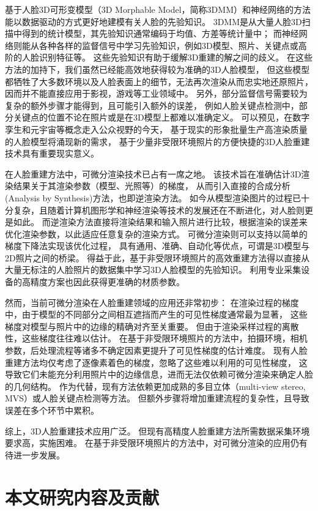 基于人脸3D可形变模型（3D Morphable Model，简称3DMM）和神经网络的方法能以数据驱动的方式更好地建模有关人脸的先验知识。
3DMM是从大量人脸3D扫描中得到的统计模型，其先验知识通常编码于均值、方差等统计量中；
而神经网络则能从各种各样的监督信号中学习先验知识，例如3D模型、照片、关键点或高阶的人脸识别特征等。
这些先验知识有助于缓解3D重建的解之间的歧义。
在这些方法的加持下，我们虽然已经能高效地获得较为准确的3D人脸模型，
但这些模型都牺牲了大多数环境以及人脸表面上的细节，无法再次渲染从而忠实地还原照片，
因而并不能直接应用于影视，游戏等工业领域中。
另外，部分监督信号需要较为复杂的额外步骤才能得到，且可能引入额外的误差，
例如人脸关键点检测中，部分关键点的位置不论在照片或是在3D模型上都难以准确定义。
可以预见，在数字孪生和元宇宙等概念走入公众视野的今天，
基于现实的形象批量生产高渲染质量的人脸模型将涌现新的需求，
基于少量非受限环境照片的方便快捷的3D人脸重建技术具有重要现实意义。

在人脸重建方法中，可微分渲染技术已占有一席之地。
该技术旨在准确估计3D渲染结果关于其渲染参数（模型、光照等）的梯度，
从而引入直接的合成分析(Analysis by Synthesis)方法，也即逆渲染方法。
如今从模型渲染图片的过程已十分复杂，且随着计算机图形学和神经渲染等技术的发展还在不断进化，对人脸则更是如此。
而逆渲染方法直接将渲染结果和输入照片进行比较，根据渲染的误差来优化渲染参数，以此适应任意复杂的渲染方式。
可微分渲染则可以支持以简单的梯度下降法实现该优化过程，
具有通用、准确、自动化等优点，可谓是3D模型与2D照片之间的桥梁。
得益于此，基于非受限环境照片的高效重建方法得以直接从大量无标注的人脸照片的数据集中学习3D人脸模型的先验知识。
利用专业采集设备的高精度方案也因此获得更准确的材质参数。

然而，当前可微分渲染在人脸重建领域的应用还非常初步：
在渲染过程的梯度中，由于模型的不同部分之间相互遮挡而产生的可见性梯度通常最为显著，
这些梯度对模型与照片中的边缘的精确对齐至关重要。
但由于渲染采样过程的离散性，这些梯度往往难以估计。
在基于非受限环境照片的方法中，拍摄环境，相机参数，后处理流程等诸多不确定因素更提升了可见性梯度的估计难度。
现有人脸重建方法均仅考虑了逐像素着色的梯度，忽略了这些难以利用的可见性梯度，
这导致它们未能充分利用照片中的边缘信息，进而无法仅依赖可微分渲染来确定人脸的几何结构。
作为代替，现有方法依赖更加成熟的多目立体（multi-view stereo, MVS）或人脸关键点检测等方法。
但额外步骤将增加重建流程的复杂性，且导致误差在多个环节中累积。

综上，3D人脸重建技术应用广泛。
但现有高精度人脸重建方法所需数据采集环境要求高，实施困难。
在基于非受限环境照片的方法中，对可微分渲染的应用仍有待进一步发展。

\section{本文研究内容及贡献}

